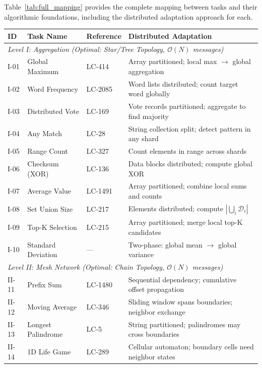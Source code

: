 Table~\ref{tab:full_mapping} provides the complete mapping between \silobench{} tasks and their algorithmic foundations, including the distributed adaptation approach for each.

\begin{table}[t]
\centering
\small
\renewcommand{\arraystretch}{1.1}
\begin{tabular}{@{}llp{3.2cm}p{6.5cm}@{}}
\toprule
\textbf{ID} & \textbf{Task Name} & \textbf{Reference} & \textbf{Distributed Adaptation} \\
\midrule
\multicolumn{4}{l}{\textit{Level I: Aggregation (Optimal: Star/Tree Topology, $\mathcal{O}(N)$ messages)}} \\
\midrule
I-01 & Global Maximum & LC-414 & Array partitioned; local max $\to$ global aggregation \\
I-02 & Word Frequency & LC-2085 & Word lists distributed; count target word globally \\
I-03 & Distributed Vote & LC-169 & Vote records partitioned; aggregate to find majority \\
I-04 & Any Match & LC-28 & String collection split; detect pattern in any shard \\
I-05 & Range Count & LC-327 & Count elements in range across shards \\
I-06 & Checksum (XOR) & LC-136 & Data blocks distributed; compute global XOR \\
I-07 & Average Value & LC-1491 & Array partitioned; combine local sums and counts \\
I-08 & Set Union Size & LC-217 & Elements distributed; compute $|\bigcup_i \mathcal{D}_i|$ \\
I-09 & Top-K Selection & LC-215 & Array partitioned; merge local top-K candidates \\
I-10 & Standard Deviation & --- & Two-phase: global mean $\to$ global variance \\
\midrule
\multicolumn{4}{l}{\textit{Level II: Mesh Network (Optimal: Chain Topology, $\mathcal{O}(N)$ messages)}} \\
\midrule
II-11 & Prefix Sum & LC-1480 & Sequential dependency; cumulative offset propagation \\
II-12 & Moving Average & LC-346 & Sliding window spans boundaries; neighbor exchange \\
II-13 & Longest Palindrome & LC-5 & String partitioned; palindromes may cross boundaries \\
II-14 & 1D Life Game & LC-289 & Cellular automaton; boundary cells need neighbor states \\

\end{tabular}
\end{table}
